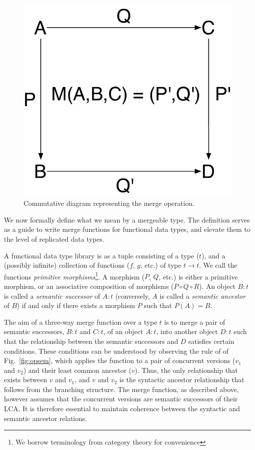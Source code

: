 \begin{figure}
\centering
\includegraphics[scale=0.4]{Figures/pushouts}

\caption{Commutative diagram representing the merge operation.}
\label{fig:pushouts}
\end{figure}

We now formally define what we mean by a mergeable type. The
definition serves as a guide to write merge functions for functional
data types, and elevate them to the level of replicated data types.

A functional data type library is as a tuple consisting of a type
($t$), and a (possibly infinite) collection of functions ($f$, $g$,
etc.) of type $t \rightarrow t$. We call the functions \emph{primitive
morphisms}\footnote{We borrow terminology from category theory for
convenience}. A morphism ($P$, $Q$, etc.) is either a primitive
morphism, or an associative composition of morphisms ($P \circ Q \circ
R$). An object $B:t$ is called a \emph{semantic successor} of $A:t$
(conversely, $A$ is called a \emph{semantic ancestor} of $B$) if and
only if there exists a morphism $P$ such that $P(A) = B$.  

The aim of a three-way merge function over a type $t$ is to merge a
pair of semantic successors, $B:t$ and $C:t$, of an object $A:t$, into
another object $D:t$ such that the relationship between the semantic
successors and $D$ satisfies certain conditions. These conditions can
be understood by observing the  rule of of
Fig.~\ref{fig:opsem}, which applies the  function to a pair
of concurrent versions ($v_1$ and $v_2$) and their least common
ancestor ($v$). Thus, the only relationship that exists between $v$
and $v_1$, and $v$ and $v_2$ is the syntactic ancestor relationship
that follows from the branching structure. The merge function, as
described above, however assumes that the concurrent versions are
semantic successors of their LCA. It is therefore essential to
maintain coherence between the syntactic and semantic ancestor
relations.

